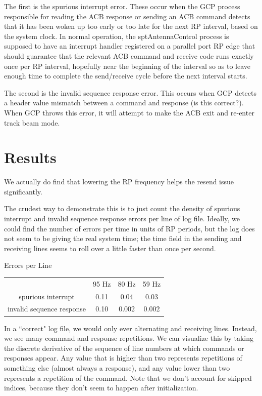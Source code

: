 \documentclass[12pt]{article}
\begin{document}
The first is the spurious interrupt error. These occur when the GCP process responsible for reading the ACB response or sending an ACB command detects that it has been woken up too early or too late for the next RP interval, based on the system clock. In normal operation, the sptAntennaControl process is supposed to have an interrupt handler registered on a parallel port RP edge that should guarantee that the relevant ACB command and receive code runs exactly once per RP interval, hopefully near the beginning of the interval so as to leave enough time to complete the send/receive cycle before the next interval starts.

The second is the invalid sequence response error. This occurs when GCP detects a header value mismatch between a command and response (is this correct?). When GCP throws this error, it will attempt to make the ACB exit and re-enter track beam mode. 

\section{Results}

We actually do find that lowering the RP frequency helps the resend issue significantly.

The crudest way to demonstrate this is to just count the density of spurious interrupt and invalid sequence response errors per line of log file. Ideally, we could find the number of errors per time in units of RP periods, but the log does not seem to be giving the real system time; the time field in the sending and receiving lines seems to roll over a little faster than once per second.

\begin{center}

Errors per Line \linebreak

\begin{tabular}{cccc}
  & 95 Hz & 80 Hz & 59 Hz \\ 
spurious interrupt & 0.11 & 0.04 & 0.03 \\ 
invalid sequence response & 0.10 & 0.002 & 0.002 \\ 
\end{tabular} 
\end{center}

In a ``correct" log file, we would only ever alternating and receiving lines. Instead, we see many command and response repetitions. We can visualize this by taking the discrete derivative of the sequence of line numbers at which commands or responses appear. Any value that is higher than two represents repetitions of something else (almost always a response), and any value lower than two represents a repetition of the command. Note that we don't account for skipped indices, because they don't seem to happen after initialization.
\end{document}

